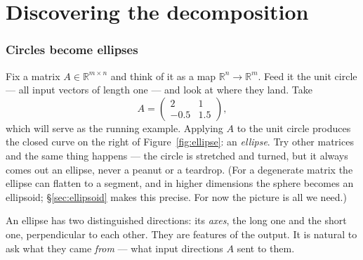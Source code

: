 \documentclass[11pt]{article}
\numberwithin{equation}{section}
\newcommand{\R}{\mathbb{R}}
\theoremstyle{plainish}
\begin{document}
\part{Discovering the decomposition}

\section{Circles become ellipses}
\label{sec:observe}

Fix a matrix $A \in \R^{m \times n}$ and think of it as a map $\R^n \to \R^m$.
Feed it the unit circle --- all input vectors of length one --- and look at where
they land. Take
\begin{equation}A = \begin{pmatrix} 2 & 1 \\ -0.5 & 1.5 \end{pmatrix},
\end{equation}
which will serve as the running example. Applying $A$ to the unit circle produces
the closed curve on the right of Figure~\ref{fig:ellipse}: an \emph{ellipse}. Try
other matrices and the same thing happens --- the circle is stretched and turned,
but it always comes out an ellipse, never a peanut or a teardrop. (For a
degenerate matrix the ellipse can flatten to a segment, and in higher dimensions
the sphere becomes an ellipsoid; \S\ref{sec:ellipsoid} makes this precise. For
now the picture is all we need.)

An ellipse has two distinguished directions: its \emph{axes}, the long one and
the short one, perpendicular to each other. They are features of the output. It
is natural to ask what they came \emph{from} --- what input directions $A$ sent
to them.
\end{document}
